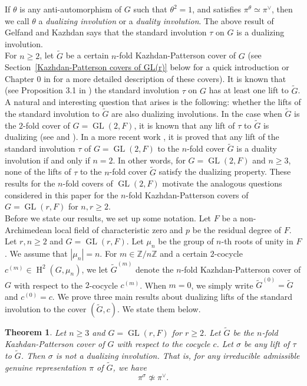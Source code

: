 \documentclass[11pt, a4paper, reqno]{amsart}
\newtheorem{theorem}{Theorem}[section]
\theoremstyle{definition}
\theoremstyle{remark}
\theoremstyle{example}
\theoremstyle{note}
\numberwithin{equation}{section}
\DeclareMathOperator{\GL}{GL}
\DeclareMathOperator{\coh}{H}
\begin{document}
If $\theta$ is any anti-automorphism of $G$ such that $\theta^{2}=1$, and satisfies $\pi^{\theta}\simeq \pi^{\vee}$, then we call $\theta$  a \textit{dualizing involution} or a \textit{duality involution}. The above result of Gelfand and Kazhdan says that the standard involution $\tau$ on $G$ is a dualizing involution. \\

For $ n\geq 2$, let $\widetilde{G}$ be a certain $n$-fold Kazhdan-Patterson cover of $G$ (see Section~\ref{Kazhdan-Patterson covers of GL(r)} below for a quick introduction or Chapter 0 in \cite{KazPat[2]} for a more detailed description of these covers). It is  known that (see Proposition 3.1 in \cite{KazPat}) the standard involution $\tau$ on $G$ has at least one lift to $\widetilde{G}$. A natural and interesting question that arises is the following: whether the lifts of the standard involution to $\widetilde{G}$ are also dualizing involutions. In the case when $\widetilde{G}$ is the $2$-fold cover of $G = \GL(2,F)$, it is known that any lift of $\tau$ to $\widetilde{G}$ is dualizing (see \cite{KumAji} and \cite{KumEkt}). In a more recent work \cite{Kumar-Renu-Sanjeev-Varsha}, it is proved that any lift of the standard involution $\tau$ of $G=\GL(2,F)$ to the $n$-fold cover $\widetilde{G}$ is a duality involution if and only if $n=2$. In other words, for $G=\GL(2,F)$ and $n\geq 3$, none of the lifts of $\tau$ to the $n$-fold cover $\widetilde{G}$ satisfy the dualizing property. These results for the $n$-fold covers of $\GL(2,F)$ motivate the analogous questions considered in this paper for the $n$-fold Kazhdan-Patterson covers of $G=\GL(r,F)$ for $n,r\geq 2$. \\

Before we state our results, we set up some notation. Let $F$ be a non-Archimedean local field of characteristic zero and $p$ be the residual degree of $F$. Let $r,n\geq 2$ and $G=\GL(r,F)$. Let $\mu_{n}$ be the group of $n$-th roots of unity in $F$. We assume that $|\mu_{n}|=n$. For $m\in \mathbb{Z}/n\mathbb{Z}$ and a certain $2$-cocycle $c^{(m)}\in \coh^{2}(G, \mu_{n})$, we let $\widetilde{G}^{(m)}$ denote the $n$-fold Kazhdan-Patterson cover of $G$ with respect to the $2$-cocycle $c^{(m)}$. When $m=0$, we simply write $\widetilde{G}^{(0)}=\widetilde{G}$ and $c^{(0)}=c$. We prove three main results about dualizing lifts of the standard involution to the cover $(\widetilde{G}, c)$. We state them below. 

\begin{theorem}\label{not duality}
Let $n \geq 3$ and $G = \GL(r,F)$ for $r\geq 2$. Let $\widetilde{G}$ be the $n$-fold Kazhdan-Patterson cover of $G$ with respect to the cocycle $c$. Let $\sigma$ be any lift of $\tau$ to $\widetilde{G}$. Then $\sigma$ is not a dualizing involution. That is, for any irreducible admissible genuine representation $\pi$ of $\widetilde{G}$, we have 
\[\pi^{\sigma}\not\simeq\pi^{\vee}.\]
\end{theorem}
\end{document}
